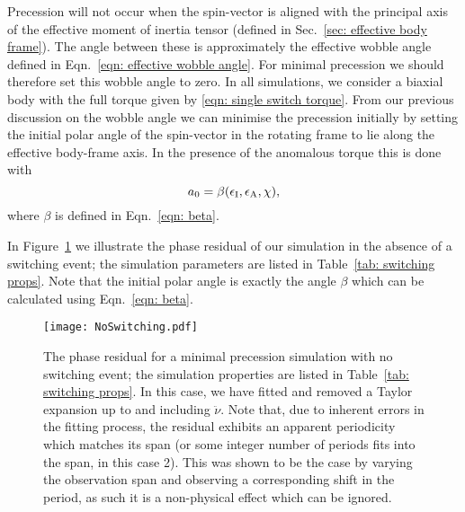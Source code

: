 \documentclass[../full_thesis/full_thesis.tex]{subfiles}
\newcommand{\thisdir}{../inertial_frame}
\begin{document}
Precession will not occur when the spin-vector is aligned with the principal
axis of the effective moment of inertia tensor (defined in Sec.~\ref{sec:
effective body frame}). The angle between these is approximately the
effective wobble angle defined in Eqn.~\eqref{eqn: effective wobble angle}.
For minimal precession we should therefore set this wobble angle to
zero. In all simulations, we consider a biaxial body with the full torque given
by \eqref{eqn: single switch torque}. From our previous discussion on the
wobble angle we can minimise the precession initially by setting the initial polar angle
of the spin-vector in the rotating frame to lie along the effective body-frame
axis. In the presence of the anomalous torque this is done with
\begin{equation}
a_{0} = \beta(\epsilon_{\mathrm{I}}, \epsilon_{\mathrm{A}}, \chi),
\end{equation}
where $\beta$ is defined in Eqn.~\eqref{eqn: beta}.

In Figure~\ref{fig: no switching} we illustrate the phase residual of our
simulation in the absence of a switching event; the simulation parameters are
listed in Table~\ref{tab: switching props}. Note that the initial polar angle
is exactly the angle $\beta$ which can be calculated using Eqn.~\eqref{eqn:
beta}.

\begin{figure}[htb]
\texttt{[image: NoSwitching.pdf]}
\caption{The phase residual for a minimal precession simulation with no
         switching event; the simulation properties are listed in
         Table~\ref{tab: switching props}. In this case, we have fitted and
         removed a Taylor expansion up to and including $\ddot{\nu}$.
         Note that, due to inherent errors in the fitting process, the residual
         exhibits an apparent periodicity which matches its span (or some integer
         number of periods fits into the span, in this case 2). This was shown
         to be the case by varying the observation span and observing a
         corresponding shift in the period, as such it is a non-physical effect
         which can be ignored.
}
\label{fig: no switching}
\end{figure}

\begin{table}[htb]
\centering

\caption{Simulation properties used for Figure~\ref{fig: no switching},
Figure~\ref{fig: switching without anom}, and Figure~\ref{fig: switching with anom}.}
\label{tab: switching props}
\end{table}
\end{document}
